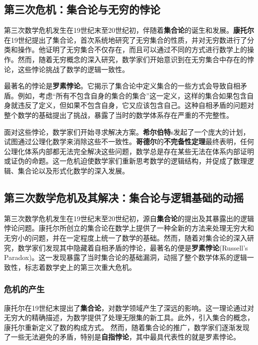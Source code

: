 \subsection{第三次危机：集合论与无穷的悖论}

第三次数学危机发生在19世纪末至20世纪初，伴随着{\bf 集合论}的诞生和发展。{\bf 康托尔}在19世纪提出了集合论，首次系统地研究了无穷集合的性质，并对无穷数进行了分类和操作。他证明了无穷集合不仅存在，而且可以通过不同的方式进行数学上的操作。然而，随着无穷概念的深入研究，数学家们开始意识到在无穷集合中存在的悖论，这些悖论挑战了数学的逻辑一致性。

最著名的悖论是{\bf 罗素悖论}。它揭示了集合论中定义集合的一些方式会导致自相矛盾。例如，考虑“所有不包含自身的集合的集合”这一定义，这样的集合如果包含自身就违反了定义，但如果不包含自身，它又应该包含自己。这种自相矛盾的问题对整个数学的基础提出了挑战，暴露了当时的数学体系存在严重的不完整性。

面对这些悖论，数学家们开始寻求解决方案。{\bf 希尔伯特}s发起了一个庞大的计划，试图通过公理化数学来消除这些不一致性。{\bf 哥德尔}的{\bf 不完备性定理}最终表明，任何公理化体系内部都无法完全解决这些问题，数学总是存在某些无法在体系内部证明或证伪的命题。这一危机迫使数学家们重新思考数学的逻辑结构，并促成了数理逻辑、集合论以及形式化数学的深入发展。

\subsection{第三次数学危机及其解决：集合论与逻辑基础的动摇}

第三次数学危机发生在19世纪末至20世纪初，源自{\bf 集合论}的提出及其暴露出的逻辑悖论问题。康托尔所创立的集合论在数学上提供了一种全新的方法来处理无穷大和无穷小的问题，并在一定程度上统一了数学的基础。然而，随着对集合论的深入研究，数学家们发现其中隐藏着自相矛盾的悖论，最著名的便是{\bf 罗素悖论}(Russell’s Paradox)。这一发现暴露了当时集合论的基础漏洞，动摇了整个数学体系的逻辑一致性，标志着数学史上的第三次重大危机。

\subsubsection{危机的产生}

康托尔在19世纪末提出了{\bf 集合论}，对数学领域产生了深远的影响。这一理论通过对无穷大的精确描述，为数学提供了处理无限集的新工具。此外，引入集合的概念，康托尔重新定义了数的构成方式。
然而，随着集合论的推广，数学家们逐渐发现了一些无法避免的矛盾，特别是{\bf 自指悖论}，其中最具代表性的就是罗素悖论。

